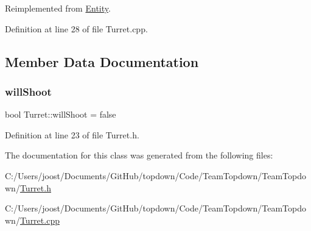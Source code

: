 Reimplemented from \hyperlink{class_entity_aed73e98b980b85833428c935cc1c69f8}{Entity}.



Definition at line 28 of file Turret.\+cpp.



\subsection{Member Data Documentation}
\mbox{\label{class_turret_a342932889ec85dbc05e73341ad658e19}} 
\subsubsection{\texorpdfstring{will\+Shoot}{willShoot}}
{\footnotesize\ttfamily bool Turret\+::will\+Shoot = false}



Definition at line 23 of file Turret.\+h.



The documentation for this class was generated from the following files\+:\begin{DoxyCompactItemize}
\item 
C\+:/\+Users/joost/\+Documents/\+Git\+Hub/topdown/\+Code/\+Team\+Topdown/\+Team\+Topdown/\hyperlink{_turret_8h}{Turret.\+h}\item 
C\+:/\+Users/joost/\+Documents/\+Git\+Hub/topdown/\+Code/\+Team\+Topdown/\+Team\+Topdown/\hyperlink{_turret_8cpp}{Turret.\+cpp}\end{DoxyCompactItemize}
